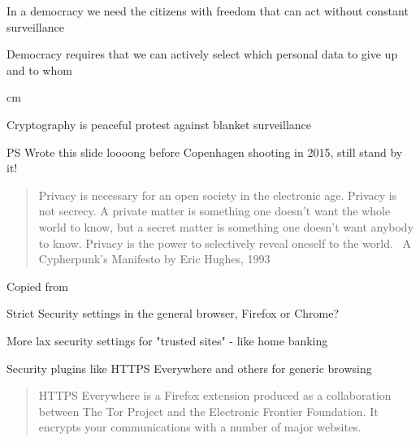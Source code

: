\documentclass[20pt,landscape,a4paper,footrule]{foils}
\begin{document}

{\large
In a democracy we need the citizens with freedom that can act without constant surveillance

Democracy requires that we can actively select which personal data to give up and to whom
}


 cm
\centerline{\large Cryptography is peaceful protest against blanket surveillance}

\vskip 2cm
PS Wrote this slide loooong before Copenhagen shooting in 2015, still stand by it!




\begin{quote}
	Privacy is necessary for an open society in the electronic age. Privacy is not secrecy. A private matter is something one doesn't want the whole world to know, but a secret matter is something one doesn't want anybody to know. Privacy is the power to selectively reveal oneself to the world. ~A Cypherpunk's Manifesto by Eric Hughes, 1993
\end{quote}

Copied from 





\begin{list2}
\item Strict Security settings in the general browser, Firefox or Chrome?
\item More lax security settings for "trusted sites" - like home banking
\item Security plugins like HTTPS Everywhere and others for generic browsing
\end{list2}


\begin{quote}
HTTPS Everywhere is a Firefox extension produced as a collaboration between The Tor Project and the Electronic Frontier Foundation. It encrypts your communications with a number of major websites.
\end{quote}

\centerline{}
\end{document}
